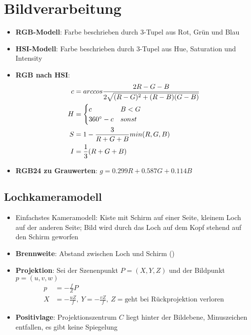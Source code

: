 \section{Bildverarbeitung}%
\label{bild:sec:bildverarbeitung}

\begin{itemize}
	\item \textbf{RGB-Modell}: Farbe beschrieben durch 3-Tupel aus Rot, Grün und Blau
	\item \textbf{HSI-Modell}: Farbe beschrieben durch 3-Tupel aus Hue, Saturation und Intensity
	\item \textbf{RGB nach HSI}:
	\begin{align*}
		c &= arccos \frac{2R - G - B}{2\sqrt{(R - G)^2 + (R - B)(G - B)}}\\
		H &= \begin{cases}
			c & B < G\\
			360\degree - c & sonst
		\end{cases}\\
		S &= 1 - \frac{3}{R + G + B}min(R, G, B)\\
		I &= \frac{1}{3}(R + G + B)
	\end{align*}
	\item \textbf{RGB24 zu Grauwerten}: $g = 0.299R + 0.587G + 0.114B$
\end{itemize}

\subsection{Lochkameramodell}%
\label{bild:sub:lochkameramodell}

\begin{itemize}
	\item Einfachstes Kameramodell: Kiste mit Schirm auf einer Seite, kleinem Loch auf der anderen Seite; Bild wird durch das Loch auf dem Kopf stehend auf den Schirm geworfen
	\item \textbf{Brennweite}: Abstand zwischen Loch und Schirm ()
	\item \textbf{Projektion}: Sei der Szenenpunkt $P = (X, Y, Z)$ und der Bildpunkt $p = (u, v, w)$
	\begin{align*}
		p &= -\frac{f}{Z}P\\
		X &= -\frac{uZ}{f},\ Y = -\frac{vZ}{f},\ Z = \text{geht bei Rückprojektion verloren}
	\end{align*}
	\item \textbf{Positivlage}: Projektionszentrum $C$ liegt hinter der Bildebene, Minuszeichen entfallen, es gibt keine Spiegelung
\end{itemize}

